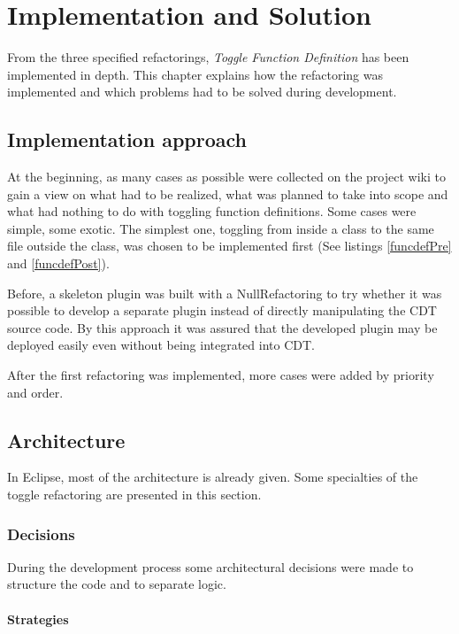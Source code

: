 \chapter{Implementation and Solution}
\thispagestyle{fancy}

From the three specified refactorings, \textit{Toggle Function Definition} has 
been implemented in depth. This chapter explains how the refactoring was 
implemented and which problems had to be solved during development.

\section{Implementation approach}

At the beginning, as many cases as possible were collected on the project wiki 
to gain a view on what had to be realized, what was planned to take into scope 
and what had nothing to do with toggling function definitions. Some cases were 
simple, some exotic. The simplest one, toggling from inside a class to the same 
file outside the class, was chosen to be implemented first (See listings 
\ref{funcdefPre} and \ref{funcdefPost}). 

Before, a skeleton plugin was built with a NullRefactoring to try whether it was
possible to develop a separate plugin instead of directly manipulating the CDT
source code. By this approach it was assured that the developed plugin may be
deployed easily even without being integrated into CDT.

After the first refactoring was implemented, more cases were added by priority
and order.

\section{Architecture}

In Eclipse, most of the architecture is already given. Some specialties of the 
toggle refactoring are presented in this section.

\subsection{Decisions}

During the development process some architectural decisions were made to
structure the code and to separate logic.

\subsubsection{Strategies}

